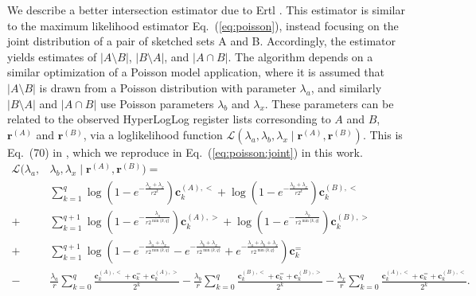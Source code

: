 \documentclass[10]{article}
\begin{document}
We describe a better intersection estimator due to Ertl \cite{ertl2017new}.
This estimator is similar to the maximum likelihood estimator Eq.~(\ref{eq:poisson}), instead focusing on the joint distribution of a pair of sketched sets A and B.
Accordingly, the estimator yields estimates of $|A \setminus B|$, $|B \setminus A|$, and $|A \cap B|$. 
The algorithm depends on a similar optimization of a Poisson model application, where it is assumed that $|A \setminus B|$ is drawn from a Poisson distribution with parameter $\lambda_a$, and similarly $|B \setminus A|$ and $|A \cap B|$ use Poisson parameters $\lambda_b$ and $\lambda_x$. These parameters can be related to the observed HyperLogLog register lists corresonding to $A$ and $B$, $\mathbf{r}^{(A)}$ and $\mathbf{r}^{(B)}$, via a loglikelihood function $\mathcal{L}(\lambda_a, \lambda_b, \lambda_x \mid \mathbf{r}^{(A)}, \mathbf{r}^{(B)})$. 
This is Eq.~(70) in \cite{ertl2017new}, which we reproduce in Eq.~(\ref{eq:poisson:joint}) in this work. 
%
\begin{equation} \label{eq:poisson:joint}
\begin{alignedat}{1} 
		\mathcal{L}(\lambda_a, &\lambda_b, \lambda_x \mid \mathbf{r}^{(A)}, \mathbf{r}^{(B)}) = 
		\\
		&\sum_{k=1}^q \log \left ( 1 - e^{-\frac{\lambda_a + \lambda_x}{r2^k}} \right ) \mathbf{c}^{(A), <}_k 
		+ \log \left ( 1 - e^{-\frac{\lambda_b + \lambda_x}{r2^k}} \right ) \mathbf{c}^{(B), <}_k
		\\
		+ &\sum_{k=1}^{q+1} \log \left ( 1 - e^{-\frac{\lambda_a}{r2^{\min\{k,q\}}}} \right ) \mathbf{c}^{(A), >}_k
		+ \log \left ( 1 - e^{-\frac{\lambda_b}{r2^{\min\{k,q\}}}} \right ) \mathbf{c}^{(B), >}_k 
		\\
		+ &\sum_{k=1}^{q+1} \log \left ( 1 - e^{-\frac{\lambda_a + \lambda_x}{r2^{\min\{k,q\}}}} 
				- e^{-\frac{\lambda_b + \lambda_x}{r2^{\min\{k,q\}}}} + e^{-\frac{\lambda_a + \lambda_b + \lambda_x}{r2^{\min\{k,q\}}}} \right ) \mathbf{c}^{=}_k 
		\\
		- &\frac{\lambda_a}{r} \sum_{k=0}^q \frac{\mathbf{c}^{(A),<}_k + \mathbf{c}^{=}_k + \mathbf{c}^{(A),>}_k}{2^k}
		- \frac{\lambda_b}{r} \sum_{k=0}^q \frac{\mathbf{c}^{(B),<}_k + \mathbf{c}^{=}_k + \mathbf{c}^{(B),>}_k}{2^k}
		- \frac{\lambda_x}{r} \sum_{k=0}^q \frac{\mathbf{c}^{(A),<}_k + \mathbf{c}^{=}_k + \mathbf{c}^{(B),<}_k}{2^k}.
\end{alignedat}
\end{equation}
\end{document}
